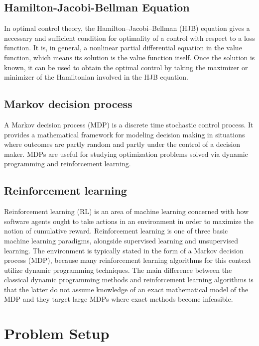 \documentclass[12pt]{article}
\begin{document}
\subsection{Hamilton-Jacobi-Bellman Equation}

In optimal control theory, the Hamilton–Jacobi–Bellman (HJB) equation gives a necessary and suﬃcient condition for optimality of a control with respect to a loss function. It is, in general, a nonlinear partial diﬀerential equation in the value function, which means its solution is the value function itself. Once the solution is known, it can be used to obtain the optimal control by taking the maximizer or minimizer of the Hamiltonian involved in the HJB equation.

\subsection{Markov decision process}

A Markov decision process (MDP) is a discrete time stochastic control process. It provides a mathematical framework for modeling decision making in situations where outcomes are partly random and partly under the control of a decision maker. MDPs are useful for studying optimization problems solved via dynamic programming and reinforcement learning.

\subsection{Reinforcement learning}

Reinforcement learning (RL) is an area of machine learning concerned with how software agents ought to take actions in an environment in order to maximize the notion of cumulative reward. Reinforcement learning is one of three basic machine learning paradigms, alongside supervised learning and unsupervised learning. The environment is typically stated in the form of a Markov decision process (MDP), because many reinforcement learning algorithms for this context utilize dynamic programming techniques. The main diﬀerence between the classical dynamic programming methods and reinforcement learning algorithms is that the latter do not assume knowledge of an exact mathematical model of the MDP and they target large MDPs where exact methods become infeasible.



\section{Problem Setup}
\end{document}
